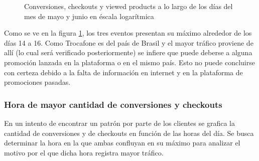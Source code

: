 \documentclass[a4paper]{article}
\begin{document}
\begin{figure}[h!]
	\caption{Conversiones, checkouts y viewed products a lo largo de los días del mes de mayo y junio en éscala logarítmica}
	\label{fig:mayojunio}
\end{figure}

Como se ve en la figura \ref{fig:mayojunio}, los tres eventos presentan su máximo alrededor de los días 14 a 16. Como Trocafone es del país de Brasil y el mayor tráfico proviene de allí (lo cual será verificado posteriormente) se infiere que puede deberse a alguna promoción lanzada en la plataforma o en el mismo país. Esto no puede concluirse con certeza debido a la falta de información en internet y en la plataforma de promociones pasadas.

\subsubsection{Hora de mayor cantidad de conversiones y checkouts}

En un intento de encontrar un patrón por parte de los clientes se grafica la cantidad de conversiones y de checkouts en función de las horas del día. Se busca determinar la hora en la que ambas confluyan en su máximo para analizar el motivo por el que dicha hora registra mayor tráfico.
\end{document}
